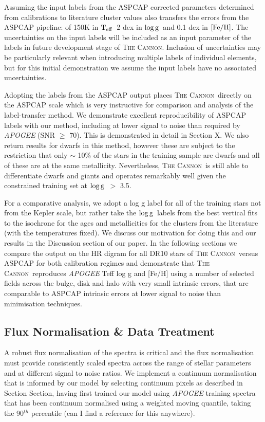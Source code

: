 \documentclass[12pt, preprint]{aastex}
\newcommand{\sectionname}{Section}
\newcommand{\teff}{\mbox{$\rm T_{eff}$}}
\newcommand{\feh}{\mbox{$\rm [Fe/H]$}}
\newcommand{\logg}{\mbox{$\rm \log g$}}
\newcommand{\tc}{\textsc{The Cannon}}
\begin{document}
Assuming the input labels from the ASPCAP corrected parameters determined from calibrations to literature cluster values also transfers the errors from the ASPCAP pipeline: of 150K in \teff\,  2 dex in \logg\ and 0.1 dex in \feh.   The uncertainties on the input labels will be included as an input parameter of the labels in future development stage of \tc. Inclusion of uncertainties may be particularly relevant when introducing multiple labels of individual elements, but for this initial demonstration we assume the input labels have no associated uncertainties. 

Adopting the labels from the ASPCAP output places \tc\ directly on the ASPCAP scale which is very instructive for comparison and analysis of the label-transfer method. We demonstrate excellent reproducibility of ASPCAP labels with our method, including at lower signal to noise than required by \textit{APOGEE} (SNR $\ge$ 70). This is demonstrated in detail in Section X. We also return results for dwarfs in this method, however these are subject to the restriction that only $\sim$ 10\% of the stars in the training sample are dwarfs and all of these are at the same metallicity. Nevertheless, \tc\ is still able to differentiate dwarfs and giants and operates remarkably well given the constrained training set at \logg\ $>$ 3.5. 


For a comparative analysis, we adopt a log g label for all of the training stars not from the Kepler scale, but rather take the \logg\ labels from the best vertical fits to the isochrone for the ages and metallicities for the clusters from the literature (with the temperatures fixed). We discuss our motivation for doing this and our results in the Discussion section of our paper. In the following sections we compare the output on the HR digram for all DR10 stars of \tc\ versus ASPCAP for both calibration regimes and demonstrate that \tc\ reproduces \textit{APOGEE} Teff log g and [Fe/H] using a number of selected fields across the bulge, disk and halo with very small intrinsic errors, that are comparable to ASPCAP intrinsic errors at lower signal to noise than minimisation techniques.

\subsection{Flux Normalisation \& Data Treatment}

A robust flux normalisation of the spectra is critical and the flux normalisation must provide consistently scaled spectra across the range of stellar parameters and at different signal to noise ratios. We implement a continuum normalisation that is informed by our model by selecting continuum pixels as described in Section \sectionname{}, having first trained our model using \textit{APOGEE} training spectra that has been continuum normalised using a weighted moving quantile, taking the 90$^{th}$ percentile (can I find a reference for this anywhere). 
\end{document}
